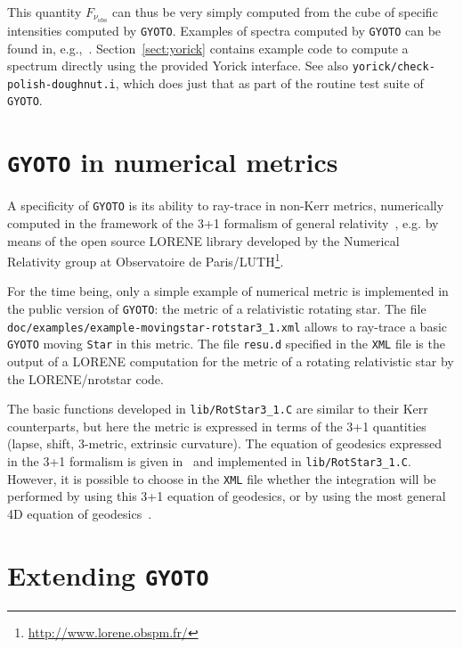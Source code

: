 \documentclass[a4paper,12pt]{article}
\newcommand{\GYOTO}{\texttt{GYOTO}}
\begin{document}
This quantity $F_{\nu_{\mathrm{obs}}}$ can thus be very simply
computed from the cube of specific intensities computed by
\texttt{GYOTO}. Examples of spectra computed by \texttt{GYOTO} can be
found in, e.g.,~\citet{straub12}. Section~\ref{sect:yorick} contains
example code to compute a spectrum directly using the provided Yorick
interface. See also \texttt{yorick/check-polish-doughnut.i}, which
does just that as part of the routine test suite of \GYOTO.


\section{\texttt{GYOTO} in numerical metrics}
\label{3+1}

A specificity of \texttt{GYOTO} is its ability to ray-trace in non-Kerr metrics, numerically computed in the framework of the 3+1 formalism of general relativity~\citep{gourgoulhon12}, e.g. by means of the open source LORENE library developed by the Numerical Relativity group at Observatoire de Paris/LUTH\footnote{\url{http://www.lorene.obspm.fr/}}. 

\begin{sloppypar}
For the time being, only a simple example of numerical metric is implemented in the public version of \texttt{GYOTO}: the metric of a relativistic rotating star. The file \texttt{doc/examples/example-movingstar-rotstar3\_1.xml} allows to ray-trace a basic \texttt{GYOTO} moving \texttt{Star} in this metric. The file \texttt{resu.d} specified in the \texttt{XML} file is the output of a LORENE computation for the metric of a rotating relativistic star by the LORENE/nrotstar code.
\end{sloppypar}

The basic functions developed in \texttt{lib/RotStar3\_1.C} are similar to their Kerr counterparts, but here the metric is expressed in terms of the 3+1 quantities (lapse, shift, 3-metric, extrinsic curvature). The equation of geodesics expressed in the 3+1 formalism is given in~\citet{vincent12a} and implemented in \texttt{lib/RotStar3\_1.C}. However, it is possible to choose in the \texttt{XML} file whether the integration will be performed by using this 3+1 equation of geodesics, or by using the most general 4D equation of geodesics~\citep[see][for a comparison of the two methods]{vincent11a}.

\section{Extending \GYOTO}
\end{document}
